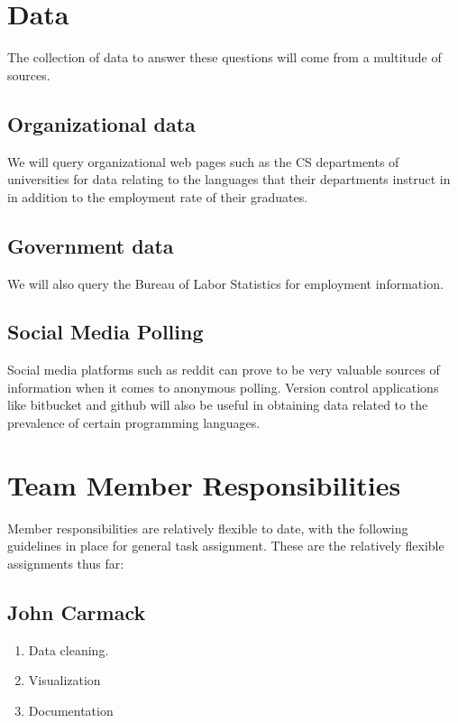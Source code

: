 \documentclass[letterpaper, 10 pt, conference]{ieeeconf}  %
\begin{document}
\section{Data}

The collection of data to answer these questions will come from a multitude of sources. 

\subsection{Organizational data}

We will query organizational web pages such as the CS departments of universities for data relating to the languages that their departments instruct in in addition to the employment rate of their graduates.

\subsection{Government data}

We will also query the Bureau of Labor Statistics for employment information.

\subsection{Social Media Polling}
Social media platforms such as reddit can prove to be very valuable sources of information when it comes to anonymous polling. Version control applications like bitbucket and github will also be useful in obtaining data related to the prevalence of certain programming languages. 

\section{Team Member Responsibilities}
Member responsibilities are relatively flexible to date, with the following guidelines in place for general task assignment. These are the relatively flexible assignments thus far: 

\subsection{John Carmack}
\begin{enumerate}
    \item Data cleaning.
    \item Visualization
    \item Documentation
\end{enumerate}
\end{document}
